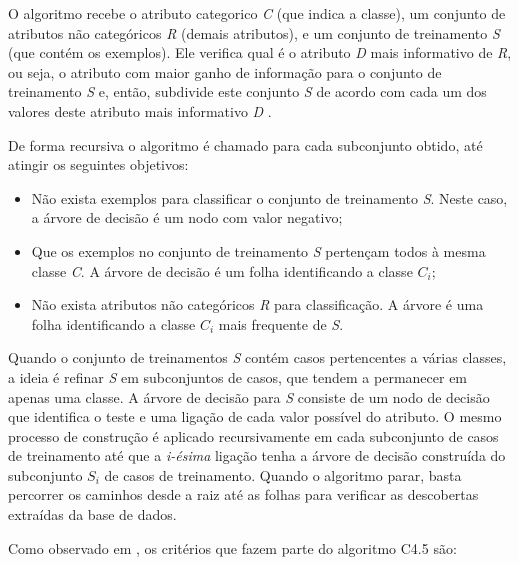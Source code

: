 \documentclass[
	12pt,				%
	openright,			%
	oneside,	
	a4paper,				%
	english,				%
	brazil				%
]{abntex2/abntex2} %
\begin{document}
	O algoritmo recebe o atributo categorico \textit{C} (que indica a classe), um conjunto de atributos não categóricos \textit{R} (demais atributos), e um conjunto de treinamento \textit{S} (que contém os exemplos). Ele verifica qual é o atributo \textit{D} mais informativo de \textit{R}, ou seja, o atributo com maior ganho de informação para o conjunto de treinamento \textit{S} e, então, subdivide este conjunto \textit{S} de acordo com cada um dos valores deste atributo mais informativo \textit{D} \cite{feldens:1997}.
	
	De forma recursiva o algoritmo é chamado para cada subconjunto obtido, até atingir os seguintes objetivos:
	
	\begin{itemize}
		\item Não exista exemplos para classificar o conjunto de treinamento \textit{S}. Neste caso, a árvore de decisão é um nodo com valor negativo;
		\item Que os exemplos no conjunto de treinamento \textit{S} pertençam todos à mesma classe \textit{C}. A árvore de decisão é um folha identificando a classe \textit{$C_i$};
		\item Não exista atributos não categóricos \textit{R} para classificação. A árvore é uma folha identificando a classe \textit{$C_i$} mais frequente de \textit{S}.
	\end{itemize}
	
	Quando o conjunto de treinamentos \textit{S} contém casos pertencentes a várias classes, a ideia é refinar \textit{S} em subconjuntos de casos, que tendem a permanecer em apenas uma classe. A árvore de decisão para \textit{S} consiste de um nodo de decisão que identifica o teste e uma ligação de cada valor possível do atributo. O mesmo processo de construção é aplicado recursivamente em cada subconjunto de casos de treinamento até que a \textit{i-ésima} ligação tenha a árvore de decisão construída do subconjunto \textit{$S_i$} de casos de treinamento. Quando o algoritmo parar, basta percorrer os caminhos desde a raiz até as folhas para verificar as descobertas extraídas da base de dados.
	
	Como observado em \cite{halmenschlager:2002}, os critérios que fazem parte do algoritmo C4.5 são:
	
\end{document}
